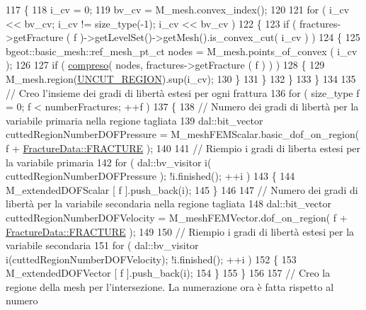 \begin{DoxyCode}
117         \{
118             i\_cv = 0;
119             bv\_cv = M\_mesh.convex\_index();
120             
121             \textcolor{keywordflow}{for} ( i\_cv << bv\_cv; i\_cv != size\_type(-1); i\_cv << bv\_cv )
122             \{
123                 \textcolor{keywordflow}{if} ( fractures->getFracture ( f )->getLevelSet()->getMesh().is\_convex\_cut( i\_cv ) )
124                 \{
125                     bgeot::basic\_mesh::ref\_mesh\_pt\_ct nodes = M\_mesh.points\_of\_convex ( i\_cv );
126 
127                     \textcolor{keywordflow}{if} ( \hyperlink{classMeshHandler_a3c8a354d214222155cb4eecf8214c938}{compreso}( nodes, fractures->getFracture ( f ) ) )
128                     \{
129                                 M\_mesh.region(\hyperlink{classMeshHandler_a239707613811024a58eece39a4c9bab3afc8bd5152d6d9b425b5e8bf4da8bd617}{UNCUT\_REGION}).sup(i\_cv);
130                     \}
131                 \}
132             \}
133         \}
134 
135         \textcolor{comment}{// Creo l'insieme dei gradi di libertà estesi per ogni frattura}
136         \textcolor{keywordflow}{for} ( size\_type f = 0; f < numberFractures; ++f )
137         \{
138             \textcolor{comment}{// Numero dei gradi di libertà per la variabile primaria nella regione tagliata}
139             dal::bit\_vector cuttedRegionNumberDOFPressure = M\_meshFEMScalar.basic\_dof\_on\_region( f + 
      \hyperlink{classFractureData_aaeea1f30482432d159eda9d98beb5e89a351538e4c78b34b5c0416e21903e1812}{FractureData::FRACTURE} );
140 
141             \textcolor{comment}{// Riempio i gradi di liberta estesi per la variabile primaria}
142             \textcolor{keywordflow}{for} ( dal::bv\_visitor i( cuttedRegionNumberDOFPressure ); !i.finished(); ++i )
143             \{
144                 M\_extendedDOFScalar [ f ].push\_back(i);
145             \}
146 
147             \textcolor{comment}{// Numero dei gradi di libertà per la variabile secondaria nella regione tagliata}
148             dal::bit\_vector cuttedRegionNumberDOFVelocity = M\_meshFEMVector.dof\_on\_region( f + 
      \hyperlink{classFractureData_aaeea1f30482432d159eda9d98beb5e89a351538e4c78b34b5c0416e21903e1812}{FractureData::FRACTURE} );
149 
150             \textcolor{comment}{// Riempio i gradi di libertà estesi per la variabile secondaria}
151             \textcolor{keywordflow}{for} ( dal::bv\_visitor i(cuttedRegionNumberDOFVelocity); !i.finished(); ++i )
152             \{
153                 M\_extendedDOFVector [ f ].push\_back(i);
154             \}
155         \}
156 
157         \textcolor{comment}{// Creo la regione della mesh per l'intersezione. La numerazione ora è fatta rispetto al numero
}
\end{DoxyCode}
